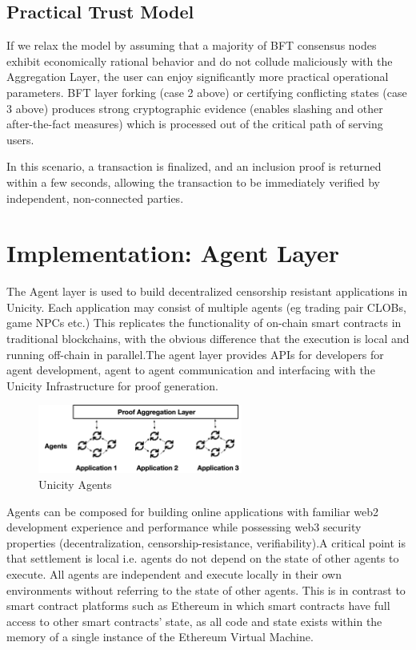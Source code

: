 \documentclass{article}
\begin{document}
\subsection{Practical Trust Model}

If we relax the model by assuming that a majority of BFT consensus nodes exhibit economically rational behavior and do not collude maliciously with the Aggregation
Layer, the user can enjoy significantly more practical operational parameters. BFT layer forking (case 2 above) or certifying conflicting states (case 3 above) produces strong cryptographic evidence (enables slashing and other after-the-fact measures) which is processed out of the critical path of serving users.

In this scenario, a transaction is finalized, and an inclusion proof is returned within a few seconds, allowing the transaction to be immediately verified by independent, non-connected parties.

\section{Implementation: Agent Layer}

The Agent layer is used to build decentralized censorship resistant applications in Unicity. Each application may consist of multiple agents (eg trading pair CLOBs, game NPCs etc.) This replicates the functionality of on-chain smart contracts in traditional blockchains, with the obvious difference that the execution is local and running off-chain in parallel.The agent layer provides APIs for developers for agent development, agent to agent communication and interfacing with the Unicity Infrastructure for proof generation.






\begin{figure}[ht]
    \centering
    \includegraphics[width=0.6\textwidth]{AgentContracts.png}
    \caption{Unicity Agents}
    \label{fig:AgentContracts}
\end{figure}


Agents can be composed for building online applications with familiar web2 development experience and performance while possessing web3 security properties (decentralization, censorship-resistance, verifiability).A critical point is that settlement is local i.e. agents do not depend on the state of other agents to execute. All agents are independent and execute locally in their own environments without referring to the state of other agents. This is in contrast to smart contract platforms such as Ethereum in which smart contracts have full access to other smart contracts' state, as all code and state exists within the memory of a single instance of the Ethereum Virtual Machine.  
\end{document}
